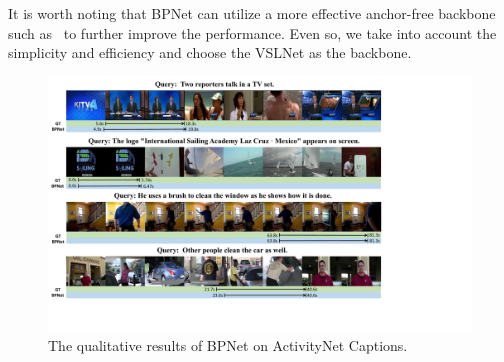 \documentclass[letterpaper]{article} %
\begin{document}
It is worth noting that BPNet can utilize a more effective anchor-free backbone
such as~\cite{DBLP:conf/aaai/ZhangPFL20,DBLP:conf/cvpr/ZengXHCTG20} to further improve the performance.
Even so, we take into account the simplicity and efficiency and choose the VSLNet as the backbone.

\begin{figure}
    \centering
    \includegraphics[height=0.46\textheight,width=\textwidth]{figure4_1_cut.pdf}
    \caption{The qualitative results of BPNet on ActivityNet Captions.}
    \label{figure4}
\end{figure}
\end{document}
